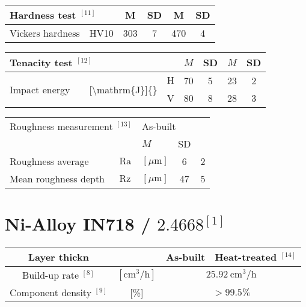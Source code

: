 \documentclass[10pt]{article}
\begin{document}
\begin{center}
\begin{tabular}{|l|c|c|c|c|c|}
\hline
\multicolumn{2}{|l|}{Hardness test $^{[11]}$} & M & SD & M & SD \\
\hline
Vickers hardness & HV10 & 303 & 7 & 470 & 4 \\
\hline
\end{tabular}
\end{center}

\begin{center}
\begin{tabular}{|c|c|c|c|c|c|c|c|}
\hline
\multicolumn{4}{|l|}{Tenacity test ${ }^{[12]}$} & $M$ & SD & $M$ & SD \\
\hline
\multirow[t]{2}{*}{Impact energy} &  & \multirow[t]{2}{*}{[\textbackslash mathrm\{J\}]\{\}} & $\mathrm{H}$ & 70 & 5 & 23 & 2 \\
\hline
 &  &  & V & 80 & 8 & 28 & 3 \\
\hline
\end{tabular}
\end{center}

\begin{center}
\begin{tabular}{|l|ll|c|c|}
\hline
\multicolumn{2}{|l|}{Roughness measurement $^{[13]}$} & \multicolumn{2}{|l|}{As-built} &  \\
\cline { 4 - 5 }
 &  & $M$ & SD &  \\
\hline
Roughness average & $\mathrm{Ra}$ & $[\mu \mathrm{m}]$ & 6 & 2 \\
\hline
Mean roughness depth & $\mathrm{Rz}$ & $[\mu \mathrm{m}]$ & 47 & 5 \\
\hline
\end{tabular}
\end{center}

\section*{Ni-Alloy IN718 / $2.4668{ }^{[1]}$}
\begin{center}
\begin{tabular}{|c|c|c|c|}
\hline
Layer thickn &  & As-built & Heat-treated ${ }^{[14]}$ \\
\hline
Build-up rate ${ }^{[8]}$ & $\left[\mathrm{cm}^{3} / \mathrm{h}\right]$ & \multicolumn{2}{|c|}{$25.92 \mathrm{~cm}^{3} / \mathrm{h}$} \\
\hline
Component density $^{[9]}$ & [\%] & \multicolumn{2}{|c|}{$>99.5 \%$} \\
\hline
\end{tabular}
\end{center}
\end{document}
